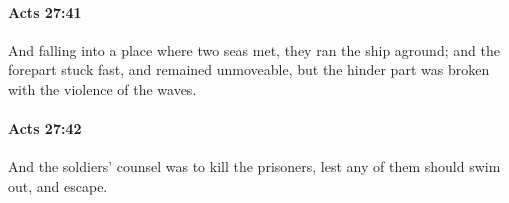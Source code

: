 		\paragraph{Acts 27:41} %
			\label{ACTS-27-41}

			And falling into a place where two seas met, they ran the ship aground; and the forepart stuck fast, and remained unmoveable, but the hinder part was broken with the violence of the waves.

			\begin{framed}
			\scriptsize
				\begin{compactdesc}
					\item[SBLG] 
				\end{compactdesc}
			\end{framed}

		\paragraph{Acts 27:42} %
			\label{ACTS-27-42}

			And the soldiers' counsel was to kill the prisoners, lest any of them should swim out, and escape.

